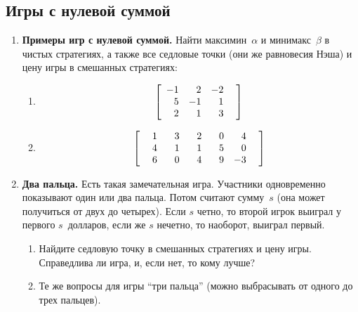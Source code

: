 \documentclass[a4paper,12pt]{article}
\def\phm{\hphantom{-}}
\begin{document}
\subsection{Игры с нулевой суммой}

\begin{enumerate}

\item {\bf Примеры игр с нулевой суммой.} Найти
максимин~$\alpha$ и минимакс~$\beta$ в чистых стратегиях, а
также все седловые точки (они же равновесия Нэша) и цену
игры в смешанных стратегиях:

\begin{enumerate}

\item \[\left[\begin{array}{lll} -1&\phm 2&-2\\ \phm 5&-1&\phm 1\\
\phm 2&\phm 1&\phm 3\phm \\
\end{array}\right]\]

\bigskip

\item \[\left[\begin{array}{lllll} \phm 1&\phm 3&\phm 2&\phm 0&\phm 4\\
\phm 4&\phm 1&\phm 1&\phm 5&\phm 0\\ \phm 6&\phm 0&\phm
4&\phm
9&-3\phm \\
\end{array}\right]\]

\end{enumerate}

\item {\bf Два пальца.} Есть такая замечательная игра.
Участники одновременно показывают один или два пальца.
Потом считают сумму~$s$ (она может получиться от двух до
четырех). Если $s$ четно, то второй игрок выиграл у первого
$s$~долларов, если же $s$ нечетно, то наоборот, выиграл
первый.

\begin{enumerate}

\item Найдите седловую точку в смешанных стратегиях и цену
игры. Справедлива ли игра, и, если нет, то кому лучше?

\item Те же вопросы для игры ``три пальца'' (можно
выбрасывать от одного до трех пальцев).

\end{enumerate}


\end{enumerate}
\end{document}
